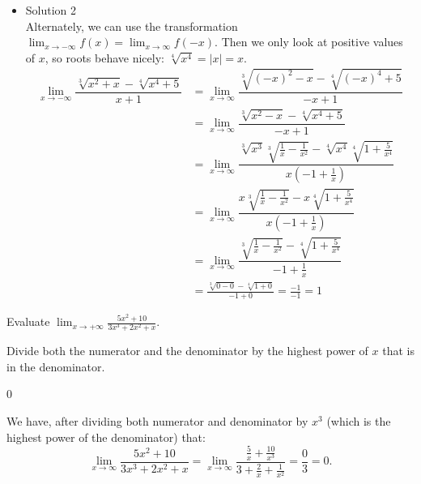 \begin{solution}
\begin{itemize}
\item Solution 2\\
Alternately, we can use the transformation $\displaystyle\lim_{x \rightarrow -\infty} f(x)=\displaystyle\lim_{x \rightarrow \infty} f(-x)$. Then we only look at positive values of $x$, so roots behave nicely: $\sqrt[4]{x^4}=|x|=x$.
\begin{align*}
\lim_{x \rightarrow -\infty}\dfrac{\sqrt[3]{x^2+x}-\sqrt[4]{x^4+5}}{x+1}&=
\lim_{x \rightarrow \infty}\dfrac{\sqrt[3]{(-x)^2-x}-\sqrt[4]{(-x)^4+5}}{-x+1}\\
&=
\lim_{x \rightarrow \infty}\dfrac{\sqrt[3]{x^2-x}-\sqrt[4]{x^4+5}}{-x+1}\\
&=
\lim_{x \rightarrow \infty}\dfrac{\sqrt[3]{x^3}\sqrt[3]{\frac{1}{x}-\frac{1}{x^2}}-\sqrt[4]{x^4}\sqrt[4]{1+\frac{5}{x^4}}}{x(-1+\frac{1}{x})}\\
&=
\lim_{x \rightarrow \infty}\dfrac{x\sqrt[3]{\frac{1}{x}-\frac{1}{x^2}}-x\sqrt[4]{1+\frac{5}{x^4}}}{x(-1+\frac{1}{x})}
\\
&=
\lim_{x \rightarrow \infty}\dfrac{\sqrt[3]{\frac{1}{x}-\frac{1}{x^2}}-\sqrt[4]{1+\frac{5}{x^4}}}{-1+\frac{1}{x}}\\
&=\frac{\sqrt[3]{0-0}-\sqrt[4]{1+0}}{-1+0}=\frac{-1}{-1}=1
\end{align*}
\end{itemize}
\end{solution}


\begin{Mquestion}[2015Q]
Evaluate
$\displaystyle\lim_{x\rightarrow +\infty} \frac{5x^2+10}{3x^3 +2x^2+x}.$
\end{Mquestion}
\begin{hint}
Divide both the numerator and the denominator by the highest
         power of $x$ that is in the denominator.
\end{hint}
\begin{answer}
0
\end{answer}
\begin{solution}
We have, after dividing both numerator and denominator by $x^3$ (which is the
highest power of the denominator) that:
$$\lim_{x \to \infty} \frac{5x^2+10}{3x^3 +2x^2+x}=\lim_{x \to\infty}\frac{\frac{5}{x}+\frac{10}{x^3}}{3+\frac{2}{x}+\frac{1}{x^2}}=\frac{0}{3}=0.$$
\end{solution}




